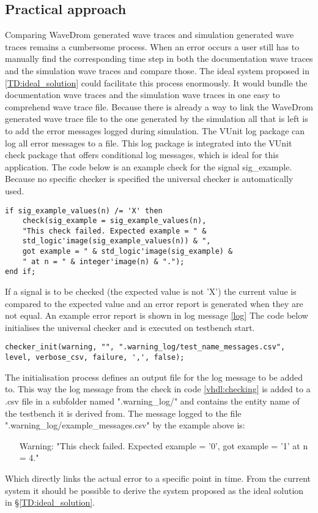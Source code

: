 \subsection{Practical approach}
Comparing WaveDrom generated wave traces and simulation generated wave traces remains a cumbersome process. When an error occurs a user still has to manually find the corresponding time step in both the documentation wave traces and the simulation wave traces and compare those.
\npar
The ideal system proposed in \ref{TD:ideal_solution} could facilitate this process enormously. It would bundle the documentation wave traces and the simulation wave traces in one easy to comprehend wave trace file.
\npar
Because there is already a way to link the WaveDrom generated wave trace file to the one generated by the simulation all that is left is to add the error messages logged during simulation. The VUnit log package can log all error messages to a file. This log package is integrated into the VUnit check package that offers conditional log messages, which is ideal for this application. The code below is an example check for the signal sig\_example. Because no specific checker is specified the universal checker is automatically used.
\begin{lstlisting}[style=vhdl, caption={Signal checking in VHDL}, label={vhdl:checking}]
if sig_example_values(n) /= 'X' then
	check(sig_example = sig_example_values(n),  
	"This check failed. Expected example = " &
	std_logic'image(sig_example_values(n)) & ", 
	got example = " & std_logic'image(sig_example) & 
	" at n = " & integer'image(n) & ".");
end if;
\end{lstlisting}\noindent
If a signal is to be checked (the expected value is not 'X') the current value is compared to the expected value and an error report is generated when they are not equal. An example error report is shown in log message \ref{log} The code below initialises the universal checker and is executed on testbench start.
\begin{lstlisting}[style=vhdl, caption={}, label={vhdl:checker_init}]
checker_init(warning, "", ".warning_log/test_name_messages.csv", level, verbose_csv, failure, ',', false);
\end{lstlisting}\noindent
The initialisation process defines an output file for the log message to be added to. This way the log message from the check in code \ref{vhdl:checking} is added to a .csv file in a subfolder named ".warning\_log/" and contains the entity name of the testbench it is derived from.
The message logged to the file ".warning\_log/example\_messages.csv" by the example above is:
\begin{customenv}\label{error_message}
	\begin{itemize}
		\item [Warning:] "This check failed. Expected example = '0', got example = '1' at n = 4."
	\end{itemize}
\end{customenv}\nline
Which directly links the actual error to a specific point in time. From the current system it should be possible to derive the system proposed as the ideal solution in §\ref{TD:ideal_solution}.
